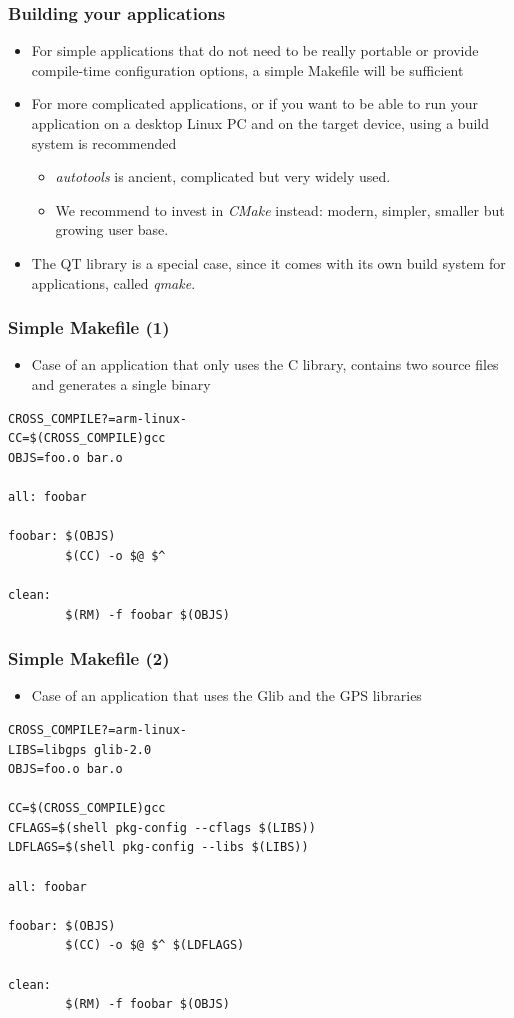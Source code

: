 \begin{frame}
  \frametitle{Building your applications}
  \begin{itemize}
  \item For simple applications that do not need to be really portable
    or provide compile-time configuration options, a simple Makefile
    will be sufficient
  \item For more complicated applications, or if you want to be able
    to run your application on a desktop Linux PC and on the target
    device, using a build system is recommended
    \begin{itemize}
    \item {\em autotools} is ancient, complicated but very
      widely used.
    \item We recommend to invest in {\em CMake} instead: modern, simpler, smaller but
      growing user base.
    \end{itemize}
  \item The QT library is a special case, since it comes with its own
    build system for applications, called {\em qmake}.
  \end{itemize}
\end{frame}

\begin{frame}[fragile]
  \frametitle{Simple Makefile (1)}
  \begin{itemize}
  \item Case of an application that only uses the C library, contains two source
    files and generates a single binary
  \end{itemize}
\begin{block}{}
\begin{verbatim}
CROSS_COMPILE?=arm-linux-
CC=$(CROSS_COMPILE)gcc
OBJS=foo.o bar.o

all: foobar

foobar: $(OBJS)
        $(CC) -o $@ $^

clean:
        $(RM) -f foobar $(OBJS)
\end{verbatim}
\end{block}
\end{frame}

\begin{frame}[fragile]
  \frametitle{Simple Makefile (2)}
\begin{itemize}
\item Case of an application that uses the Glib and the GPS libraries
\end{itemize}
\small
\begin{block}{}
\begin{verbatim}
CROSS_COMPILE?=arm-linux-
LIBS=libgps glib-2.0
OBJS=foo.o bar.o

CC=$(CROSS_COMPILE)gcc
CFLAGS=$(shell pkg-config --cflags $(LIBS))
LDFLAGS=$(shell pkg-config --libs $(LIBS))

all: foobar

foobar: $(OBJS)
        $(CC) -o $@ $^ $(LDFLAGS)

clean:
        $(RM) -f foobar $(OBJS)
\end{verbatim}
\end{block}
\end{frame}

